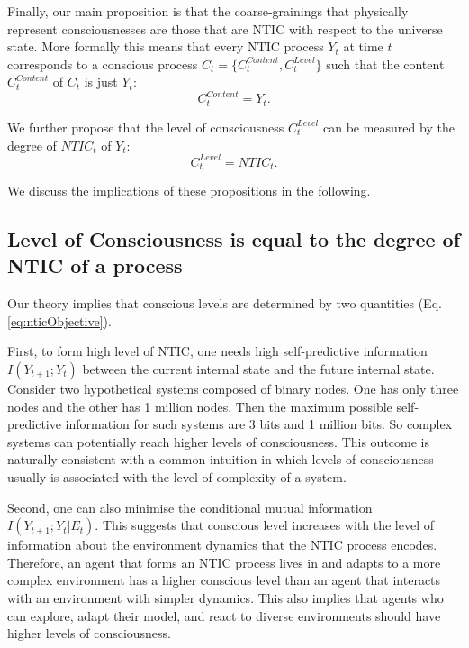 \documentclass[utf8]{article}
\begin{document}
        Finally, our main proposition is that the coarse-grainings that physically represent consciousnesses are those that are NTIC with respect to the universe state. More formally this means that every NTIC process $Y_t$ at time $t$ corresponds to a conscious process $C_t=\{C_t^{Content},C_t^{Level}\}$ such that the content $C_{t}^{Content}$ of $C_t$ is just $Y_t$:
		\begin{equation}\label{eq:cContent}
			C_{t}^{Content} = Y_{t}.
		\end{equation}
		
		
		\noindent
        We further propose that the level of consciousness $C_{t}^{Level}$ can be measured by the degree of $NTIC_{t}$ of $Y_t$:
		\begin{equation}\label{eq:cLevel}
			C_{t}^{Level} = NTIC_{t}.
		\end{equation}
		\newline

		
		We discuss the implications of these propositions in the following. 	
		
		
	    \subsection{Level of Consciousness is equal to the degree of NTIC of a process}
	    
	    Our theory implies that conscious levels are determined by two quantities (Eq. \ref{eq:nticObjective}). 
	    
	    First, to form high level of NTIC, one needs high self-predictive information $I(Y_{t+1};Y_{t})$ between the current internal state and the future internal state. 
	    Consider two hypothetical systems composed of binary nodes. One has only three nodes and the other has 1 million nodes. Then the maximum possible self-predictive information for such systems are 3 bits and 1 million bits. So complex systems can potentially reach higher levels of consciousness.
	    This outcome is naturally consistent with a common intuition in which levels of consciousness usually is associated with the level of complexity of a system.

	    Second, one can also minimise the conditional mutual information  $I(Y_{t+1};Y_{t}|E_{t})$. This suggests that conscious level increases with the level of information about the environment dynamics that the NTIC process encodes. Therefore, an agent that forms an NTIC process lives in and adapts to a more complex environment has a higher conscious level than an agent that interacts with an environment with simpler dynamics. This also implies that agents who can explore, adapt their model, and react to diverse environments should have higher levels of consciousness. 
	    
\end{document}

